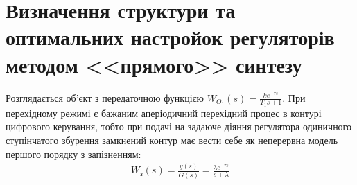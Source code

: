 \chapter{Визначення структури та оптимальних настройок регуляторів методом <<прямого>> синтезу}\label{ch:direct}
Розглядається об'єкт з передаточною функцією $W_{O_1}(s) = \frac{k e^{-\tau s}}{T_1 s + 1}$.
При перехідному режимі є бажаним аперіодичний перехідний процес в контурі цифрового керування,
тобто при подачі на задаюче діяння регулятора одиничного ступінчатого збурення
замкнений контур має вести себе як неперервна модель першого порядку з запізненням:
\begin{gather}
    W_{\text{з}}(s) = \frac{y(s)}{G(s)} = \frac{\lambda e^{-\tau s}}{s + \lambda}
\end{gather}




